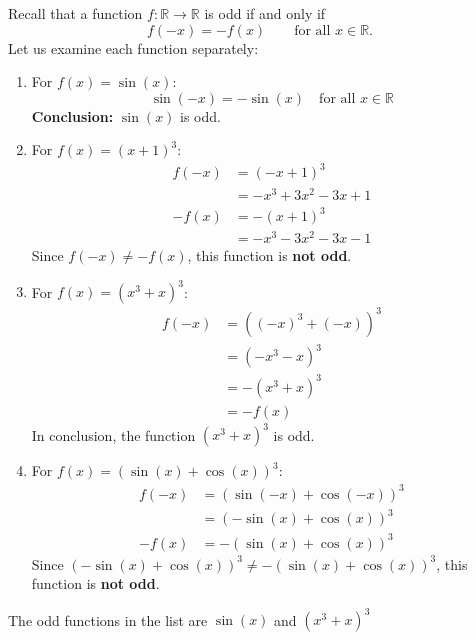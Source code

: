 \documentclass[a4paper,10 pt]{report}
\theoremstyle{definition}
\newcommand{\R}{\mathbb R}
\newcommand{\xmark}{\text{\sffamily X}} %
\begin{document}
\begin{solutionBox} Recall that a function $f:\R \longrightarrow \R$ is odd if and only if
\begin{equation*}
    f(-x) = -f(x) \qquad \text{for all $x \in \R$}.
\end{equation*}
Let us examine each function separately:

\begin{enumerate}
    \item For $f(x) = \sin(x)$:
    \begin{equation*}
        \sin(-x) = -\sin(x) \quad \text{for all $x \in \R$}
    \end{equation*}
    \textbf{Conclusion:} $\sin(x)$ is odd. \checkmark
    
    \item For $f(x) = (x+1)^3$:
    \begin{align*}
        f(-x) &= (-x+1)^3 \\
        &= -x^3 + 3x^2 - 3x + 1 \\
        -f(x) &= -(x+1)^3 \\
        &= -x^3 - 3x^2 - 3x - 1
    \end{align*}
    Since $f(-x) \neq -f(x)$, this function is \textbf{not odd}. \xmark
    
    \item For $f(x) = (x^3 + x)^3$:
    \begin{align*}
        f(-x) &= ((-x)^3 + (-x))^3 \\
        &= (-x^3 - x)^3 \\
        &= -(x^3 + x)^3 \\
        &= -f(x)
    \end{align*}
    In conclusion, the function $(x^3 + x)^3$ is odd. \checkmark
    
    \item For $f(x) = (\sin(x) + \cos(x))^3$:
    \begin{align*}
        f(-x) &= (\sin(-x) + \cos(-x))^3 \\
        &= (-\sin(x) + \cos(x))^3 \\
        -f(x) &= -(\sin(x) + \cos(x))^3
    \end{align*}
    Since $(-\sin(x) + \cos(x))^3 \neq -(\sin(x) + \cos(x))^3$, this function is \textbf{not odd}. \xmark
\end{enumerate}

\begin{finalAnswer}
The odd functions in the list are $\sin(x)$ and $(x^3 + x)^3$
\end{finalAnswer}
\end{solutionBox}
\end{document}

